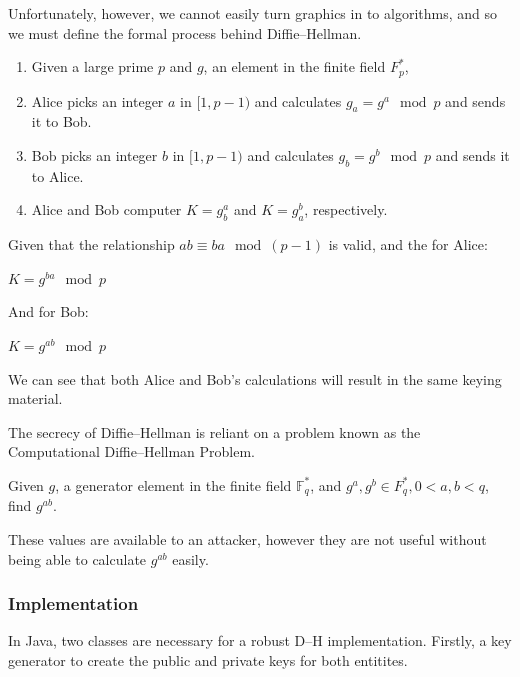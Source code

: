   Unfortunately, however, we cannot easily turn graphics in to algorithms, and so we must define the formal process behind Diffie--Hellman\cite{Mao:2003uq}.
  
  \begin{enumerate}
    \item Given a large prime $p$ and $g$, an element in the finite field $F_p^*$,
    \item Alice picks an integer $a$ in $[1,p-1)$ and calculates $g_a = g^a \mod p$ and sends it to Bob.
    \item Bob picks an integer $b$ in $[1,p-1)$ and calculates $g_b = g^b \mod p$ and sends it to Alice.
    \item Alice and Bob computer $K = g_b^a$ and $K = g_a^b$, respectively.
  \end{enumerate}
  
  Given that the relationship $ab \equiv ba \mod (p-1)$ is valid, and the for Alice:
  
  \begin{center}
    $K = g^{ba} \mod p$
  \end{center}
  
  And for Bob:
  
  \begin{center}
    $K = g^{ab} \mod p$
  \end{center}
  
  We can see that both Alice and Bob's calculations will result in the same keying material.
  
  The secrecy of Diffie--Hellman is reliant on a problem known as the Computational Diffie--Hellman Problem. 
  
  \begin{mathdef}
    Given $g$, a generator element in the finite field $\mathbb{F}_q^*$, and ${g^a,g^b} \in F_q^*, 0 < a, b < q$, find $g^{ab}$.
  \end{mathdef}
  
  These values are available to an attacker, however they are not useful without being able to calculate $g^{ab}$ easily.
  
    \subsubsection{Implementation}
    
    In Java, two classes are necessary for a robust D--H implementation. Firstly, a key generator to create the public and private keys for both entitites.
    
